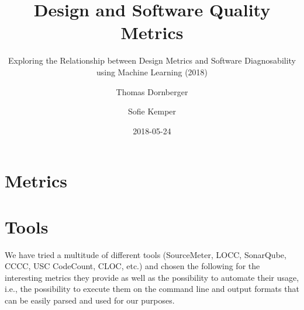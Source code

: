 \documentclass{scrartcl}
\begin{document}
\title{Design and Software Quality Metrics}
\subtitle{Exploring the Relationship between Design Metrics and Software
Diagnosability using Machine Learning (2018)}
\author{Thomas Dornberger \and Sofie Kemper}
\date{2018-05-24}

\maketitle

\section{Metrics}

%

%



%


\section{Tools}

We have tried a multitude of different tools (SourceMeter, LOCC, SonarQube,
CCCC, USC CodeCount, CLOC, etc.) and chosen the following for the interesting
metrics they provide as well as the possibility to automate their usage, i.e.,
the possibility to execute them on the command line and output formats that can
be easily parsed and used for our purposes.

%

%



%
\end{document}
